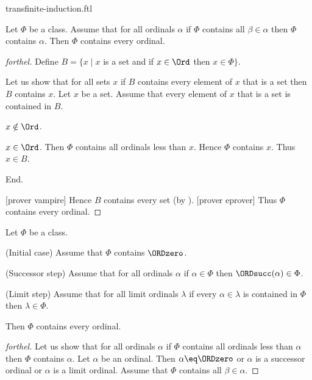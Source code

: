 \documentclass{naproche-library}
\begin{document}
\begin{smodule}[title=Transfinite Induction]{transfinite-induction.ftl}

\begin{theorem}[forthel,id=SET_THEORY_02_8493935460614144]
  Let $\Phi$ be a class.
  Assume that for all ordinals $\alpha$ if $\Phi$ contains all $\beta \in \alpha$ then $\Phi$ contains $\alpha$.
  Then $\Phi$ contains every ordinal.
\end{theorem}
\begin{proof}[forthel]
  Define $B = \{ x \mid x$ is a set and if $x \in \Ord$ then $x \in \Phi \}$.

  Let us show that for all sets $x$ if $B$ contains every element of $x$ that is a set then $B$ contains $x$.
    Let $x$ be a set.
    Assume that every element of $x$ that is a set is contained in $B$.

    \begin{case}{$x \notin \Ord$.} \end{case}

    \begin{case}{$x \in \Ord$.}
      Then $\Phi$ contains all ordinals less than $x$.
      Hence $\Phi$ contains $x$.
      Thus $x \in B$.
    \end{case}
  End.

  [prover vampire]
  Hence $B$ contains every set (by ).
  [prover eprover]
  Thus $\Phi$ contains every ordinal.
\end{proof}

\begin{theorem}[forthel,id=SET_THEORY_02_7892040431960064]
  Let $\Phi$ be a class.
  
  (Initial case) Assume that $\Phi$ contains $\ORDzero$.
  
  (Successor step) Assume that for all ordinals $\alpha$ if $\alpha \in \Phi$ then $\ORDsucc(\alpha) \in \Phi$.
  
  (Limit step) Assume that for all limit ordinals $\lambda$ if every $\alpha \in \lambda$ is contained in $\Phi$ then $\lambda \in \Phi$.
  
  Then $\Phi$ contains every ordinal.
\end{theorem}
\begin{proof}[forthel]
  Let us show that for all ordinals $\alpha$ if $\Phi$ contains all ordinals
  less than $\alpha$ then $\Phi$ contains $\alpha$.
    Let $\alpha$ be an ordinal.
    Then $\alpha \eq \ORDzero$ or $\alpha$ is a successor ordinal or $\alpha$ is a
    limit ordinal.
    Assume that $\Phi$ contains all $\beta \in \alpha$.


\end{proof}
\end{smodule}
\end{document}
